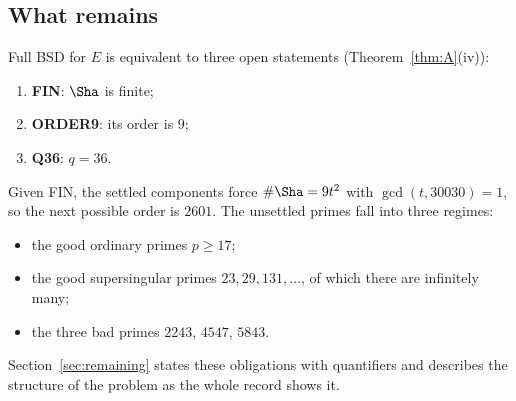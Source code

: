 \subsection{What remains}
Full BSD for $E$ is equivalent to three open statements (Theorem~\ref{thm:A}(iv)):
\begin{enumerate}[label=(\alph*)]
\item \textbf{FIN}: $\Sha$ is finite;
\item \textbf{ORDER9}: its order is $9$;
\item \textbf{Q36}: $q=36$.
\end{enumerate}
Given FIN, the settled components force $\#\Sha=9t^2$ with $\gcd(t,30030)=1$, so the next possible order is $2601$. The unsettled primes fall into three regimes:
\begin{itemize}[leftmargin=*]
\item the good ordinary primes $p\ge17$;
\item the good supersingular primes $23,29,131,\dots$, of which there are infinitely many;
\item the three bad primes $2243$, $4547$, $5843$.
\end{itemize}
Section~\ref{sec:remaining} states these obligations with quantifiers and describes the structure of the problem as the whole record shows it.

